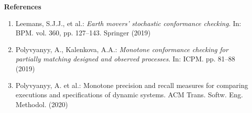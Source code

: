 \documentclass{article}
\begin{document}
\medskip


\textbf{References}
\begin{enumerate}
	\item\label{a} Leemans, S.J.J., et al.: \textit{Earth movers’ stochastic
	conformance checking}. In: BPM. vol. 360, pp. 127–143. Springer (2019)
\item\label{b} Polyvyanyy, A., Kalenkova, A.A.: \textit{Monotone conformance checking for partially
matching designed and observed processes}. In: ICPM. pp. 81–88 (2019)
\item\label{c} Polyvyanyy, A. et al.: Monotone precision and recall measures for comparing executions and specifications of dynamic
systems. ACM Trans. Softw. Eng. Methodol.  (2020)
\end{enumerate}
\end{document}
